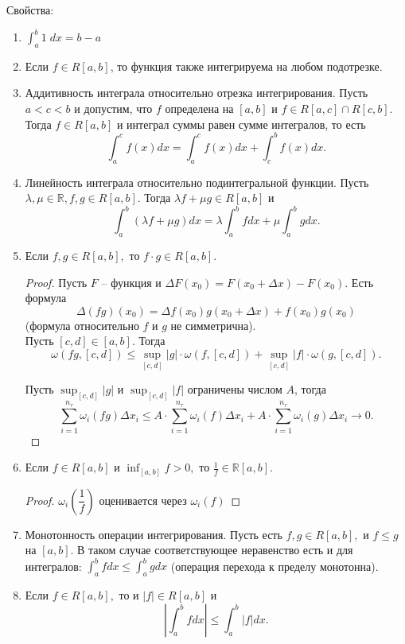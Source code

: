 \documentclass{article}
\theoremstyle{plain}
\theoremstyle{definition}
\theoremstyle{remark}
\begin{document}
Свойства:
\begin{enumerate}
    \item $\int_a^b 1 \; dx = b-a$
    \item Если $f \in R[a, b]$, то функция также интегрируема на любом подотрезке.
    \item Аддитивность интеграла относительно отрезка интегрирования. Пусть $a < c < b$ и допустим, что $f$ определена на $[a, b]$ и $f\in R[a, c] \cap R[c, b]$. Тогда $f\in R[a, b]$ и интеграл суммы равен сумме интегралов, то есть $$\int_a^c f(x)dx = \int_a^c f(x)dx + \int_c^b f(x)dx.$$
    \item Линейность интеграла относительно подинтегральной функции. Пусть $\lambda, \mu \in \mathbb{R}, f, g \in R[a, b].$ Тогда $\lambda f + \mu g \in R[a, b]$ и $$\int_a^b (\lambda f + \mu g)dx = \lambda \int_a^b f dx + \mu \int_a^b gdx.$$
    \item Если $f, g \in R[a, b],$ то $f \cdot g \in R[a, b]$. 
    \begin{proof} Пусть $F$ -- функция и $\Delta F(x_0) = F(x_0 + \Delta x) - F(x_0).$ Есть формула $$\Delta(fg)(x_0) = \Delta f(x_0)g(x_0 + \Delta x) + f(x_0)g(x_0)$$ (формула относительно $f$ и $g$ не симметрична).\\
    
    Пусть $[c, d] \in [a, b].$ Тогда $$\omega(fg, [c, d]) \leq \sup_{[c, d]}|g| \cdot \omega(f, [c, d]) + \sup_{[c, d]} |f| \cdot \omega(g, [c, d]).$$
    
    Пусть $\sup_{[c, d]}|g|$ и  $\sup_{[c, d]}|f|$ ограничены числом $A$, тогда 
    $$\sum_{i = 1}^{n_\tau} \omega_i(fg)\Delta x_i \leq A \cdot\sum_{i=1}^{n_{\tau}}\omega_i(f)\Delta x_i + A\cdot \sum_{i=1}^{n_{\tau}}\omega_i(g)\Delta x_i \to 0.$$
    \end{proof}
    \item Если $f\in R[a, b]$  и $\inf_{[a, b]} f > 0,$ то $\frac{1}{f} \in \mathbb{R}[a, b]$.
    \begin{proof}
    $\omega_i\left(\dfrac{1}{f}\right)$ оценивается через $\omega_i(f)$
    \end{proof}
    \item Монотонность операции интегрирования. Пусть есть $f, g \in R[a, b],$ и $f \leq g$ на $[a,b].$ В таком случае соответствующее неравенство есть и для интегралов: $\int_a^b fdx \leq \int_a^b gdx$ (операция перехода к пределу монотонна). 
    \item Если $f\in R[a, b],$ то и $|f| \in R[a, b]$ и
    \begin{equation}\label{ineq}
        \left|\int_a^b fdx\right| \leq \int_a^b|f|dx.
    \end{equation}
    

\end{enumerate}
\end{document}
